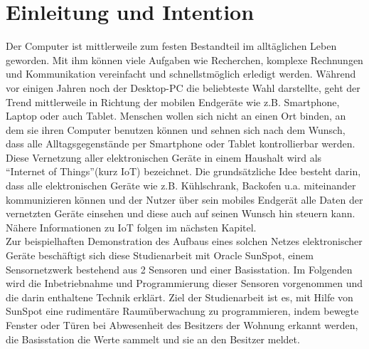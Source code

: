 \chapter{Einleitung und Intention}\label{c:Einleitung} %

Der Computer ist mittlerweile zum festen Bestandteil im alltäglichen Leben geworden. Mit ihm können viele Aufgaben wie Recherchen, komplexe Rechnungen und Kommunikation vereinfacht und schnellstmöglich erledigt werden. Während vor einigen Jahren noch der Desktop-PC die beliebteste Wahl darstellte, geht der Trend mittlerweile in Richtung der mobilen Endgeräte wie z.B. Smartphone, Laptop oder auch Tablet. Menschen wollen sich nicht an einen Ort binden, an dem sie ihren Computer benutzen können und sehnen sich nach dem Wunsch, dass alle Alltagsgegenstände per Smartphone oder Tablet kontrollierbar werden.\\

Diese Vernetzung aller elektronischen Geräte in einem Haushalt wird als \textquotedblleft Internet of Things\textquotedblright (kurz IoT) bezeichnet. Die grundsätzliche Idee besteht darin, dass alle elektronischen Geräte wie z.B. Kühlschrank, Backofen u.a. miteinander kommunizieren können und der Nutzer über sein mobiles Endgerät alle Daten der vernetzten Geräte einsehen und diese auch auf seinen Wunsch hin steuern kann. Nähere Informationen zu IoT folgen im nächsten Kapitel.\\

Zur beispielhaften Demonstration des Aufbaus eines solchen Netzes elektronischer Geräte beschäftigt sich diese Studienarbeit mit Oracle SunSpot, einem Sensornetzwerk bestehend aus 2 Sensoren und einer Basisstation. Im Folgenden wird die Inbetriebnahme und Programmierung dieser Sensoren vorgenommen und die darin enthaltene Technik erklärt. Ziel der Studienarbeit ist es, mit Hilfe von SunSpot eine rudiment\"are Raum\"uberwachung zu programmieren, indem bewegte Fenster oder Türen bei Abwesenheit des Besitzers der Wohnung erkannt werden, die Basisstation die Werte sammelt und sie an den Besitzer meldet.


